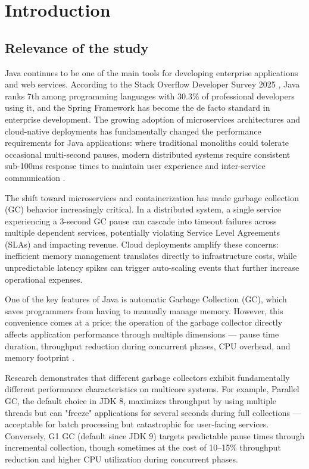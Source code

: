\chapter{Introduction}
\label{chap:intro}

\section{Relevance of the study}
\label{sec:relevance}

Java continues to be one of the main tools for developing enterprise applications and web services. According to the Stack Overflow Developer Survey 2025 \cite{stackoverflow2025survey}, Java ranks 7th among programming languages with 30.3\% of professional developers using it, and the Spring Framework has become the de facto standard in enterprise development. The growing adoption of microservices architectures and cloud-native deployments has fundamentally changed the performance requirements for Java applications: where traditional monoliths could tolerate occasional multi-second pauses, modern distributed systems require consistent sub-100ms response times to maintain user experience and inter-service communication \cite{carpen2015performance}.

The shift toward microservices and containerization has made garbage collection (GC) behavior increasingly critical. In a distributed system, a single service experiencing a 3-second GC pause can cascade into timeout failures across multiple dependent services, potentially violating Service Level Agreements (SLAs) and impacting revenue. Cloud deployments amplify these concerns: inefficient memory management translates directly to infrastructure costs, while unpredictable latency spikes can trigger auto-scaling events that further increase operational expenses.

One of the key features of Java is automatic Garbage Collection (GC), which saves programmers from having to manually manage memory. However, this convenience comes at a price: the operation of the garbage collector directly affects application performance through multiple dimensions --- pause time duration, throughput reduction during concurrent phases, CPU overhead, and memory footprint \cite{carpen2015performance, pufek2019analysis}.

Research demonstrates \cite{carpen2015performance, pufek2019analysis} that different garbage collectors exhibit fundamentally different performance characteristics on multicore systems. For example, Parallel GC, the default choice in JDK 8, maximizes throughput by using multiple threads but can "freeze" applications for several seconds during full collections --- acceptable for batch processing but catastrophic for user-facing services. Conversely, G1 GC (default since JDK 9) targets predictable pause times through incremental collection, though sometimes at the cost of 10--15\% throughput reduction and higher CPU utilization during concurrent phases.

